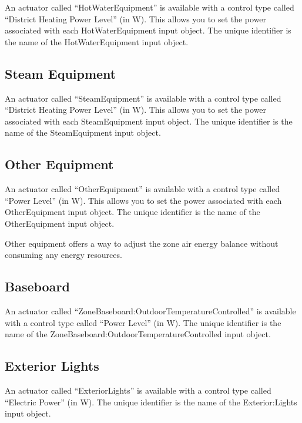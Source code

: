 An actuator called ``HotWaterEquipment'' is available with a control type called ``District Heating Power Level'' (in W). This allows you to set the power associated with each HotWaterEquipment input object. The unique identifier is the name of the HotWaterEquipment input object.

\subsection{Steam Equipment}\label{steam-equipment}

An actuator called ``SteamEquipment'' is available with a control type called ``District Heating Power Level'' (in W). This allows you to set the power associated with each SteamEquipment input object. The unique identifier is the name of the SteamEquipment input object.

\subsection{Other Equipment}\label{other-equipment}

An actuator called ``OtherEquipment'' is available with a control type called ``Power Level'' (in W). This allows you to set the power associated with each OtherEquipment input object. The unique identifier is the name of the OtherEquipment input object.

Other equipment offers a way to adjust the zone air energy balance without consuming any energy resources.

\subsection{Baseboard}\label{baseboard}

An actuator called ``ZoneBaseboard:OutdoorTemperatureControlled'' is available with a control type called ``Power Level'' (in W). The unique identifier is the name of the ZoneBaseboard:OutdoorTemperatureControlled input object.

\subsection{Exterior Lights}\label{exterior-lights}

An actuator called ``ExteriorLights'' is available with a control type called ``Electric Power'' (in W). The unique identifier is the name of the Exterior:Lights input object.

